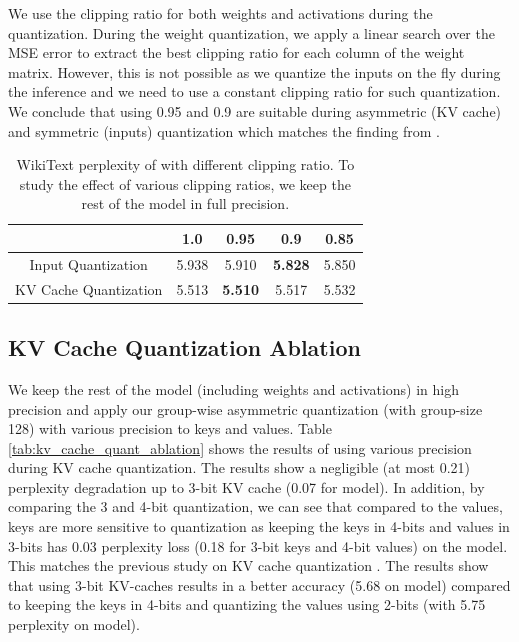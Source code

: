 We use the clipping ratio for both weights and activations during the quantization. During the weight quantization, we apply a linear search over the MSE error to extract the best clipping ratio for each column of the weight matrix. However, this is not possible as we quantize the inputs on the fly during the inference and we need to use a constant clipping ratio for such quantization.  We conclude that using 0.95 and 0.9 are suitable during asymmetric (KV cache) and symmetric (inputs) quantization which matches the finding from \citep{atom}.

\begin{table}[h]
\centering
\caption{WikiText perplexity of \llamaSmall with different clipping ratio. To study the effect of various clipping ratios, we keep the rest of the model in full precision.}
\vspace{1em}
\begin{tabular}{c|c|c|c|c}
 &  1.0 &  0.95 &  0.9 &  0.85 \\ \hline
Input Quantization & 5.938 & 5.910 & \textbf{5.828} & 5.850 \\ \hline
KV Cache Quantization & 5.513 & \textbf{5.510} & 5.517 & 5.532   \\ 
\end{tabular}
\label{tab:clipping_ratio_ablation}
\end{table}



\subsection{KV Cache Quantization Ablation}\label{sec:appx_kv_cach_quant}
We keep the rest of the model (including weights and activations) in high precision and apply our group-wise asymmetric quantization (with group-size 128) with various precision to keys and values. Table \ref{tab:kv_cache_quant_ablation} shows the results of using various precision during KV cache quantization. The results show a negligible (at most 0.21) perplexity degradation up to 3-bit KV cache (0.07 for \llamaBig model). In addition, by comparing the 3 and 4-bit quantization, we can see that compared to the values, keys are more sensitive to quantization as keeping the keys in 4-bits and values in 3-bits has 0.03 perplexity loss (0.18 for 3-bit keys and 4-bit values) on the \llamaSmall model. This matches the previous study on KV cache quantization \citep{kvquant, kivi}. The results show that using 3-bit KV-caches results in a better accuracy (5.68 on \llamaSmall model) compared to keeping the keys in 4-bits and quantizing the values using 2-bits (with 5.75 perplexity on \llamaSmall model).



